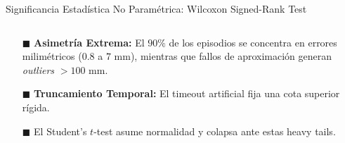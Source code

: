 \begin{frame}{Significancia Estadística No Paramétrica: Wilcoxon Signed-Rank Test}
  \vspace{0.8mm}
  \begin{columns}[T, onlytextwidth]
    \begin{column}{0.485\textwidth}
      \begin{tcolorbox}[
        enhanced,
        colback=AlertRedLight,
        colframe=AlertRed,
        arc=\CardArc,
        boxrule=\CardRule,
        height=\CardHeightDouble,
        title={\CardTitleFont Invalidez de Supuestos Gaussianos},
        colbacktitle=AlertRed,
        coltitle=WhiteBg,
        top=1.2mm, bottom=1.2mm, left=1.8mm, right=1.8mm
      ]
        {\BodyFont
        \begin{itemize}\setlength{\itemsep}{2pt}
          \item[\textcolor{AlertRed}{$\blacksquare$}] \textbf{Asimetría Extrema:} El $90\%$ de los episodios se concentra en errores milimétricos ($0.8$ a $7\text{ mm}$), mientras que fallos de aproximación generan \textit{outliers} $>100\text{ mm}$.
          \item[\textcolor{AlertRed}{$\blacksquare$}] \textbf{Truncamiento Temporal:} El timeout artificial fija una cota superior rígida.
          \item[\textcolor{AlertRed}{$\blacksquare$}] El Student's $t$-test asume normalidad y colapsa ante estas heavy tails.
        \end{itemize}}
      \end{tcolorbox}
    \end{column}


\end{columns}
\end{frame}
